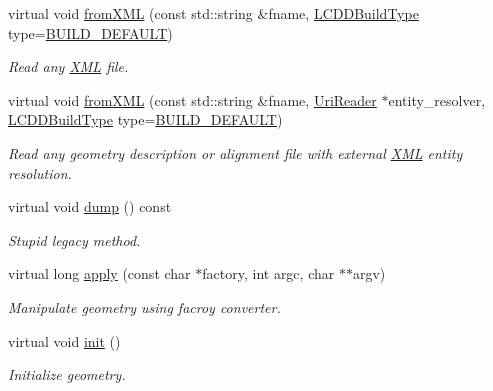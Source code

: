 \begin{DoxyCompactItemize}
virtual void \hyperlink{class_d_d4hep_1_1_geometry_1_1_l_c_d_d_imp_ade843dae125e811b1ce48f7bfa2dc0ef}{from\+X\+ML} (const std\+::string \&fname, \hyperlink{namespace_d_d4hep_acafe43ba4537ab6e999e808142965fab}{L\+C\+D\+D\+Build\+Type} type=\hyperlink{namespace_d_d4hep_acafe43ba4537ab6e999e808142965fabaceac720f961afd2369fcc9f343113a2e}{B\+U\+I\+L\+D\+\_\+\+D\+E\+F\+A\+U\+LT})
\begin{DoxyCompactList}\small\item\em Read any \hyperlink{namespace_d_d4hep_1_1_x_m_l}{X\+ML} file. \end{DoxyCompactList}\item 
virtual void \hyperlink{class_d_d4hep_1_1_geometry_1_1_l_c_d_d_imp_ae1c435032cd33235cd6405ca8d8aae9b}{from\+X\+ML} (const std\+::string \&fname, \hyperlink{class_d_d4hep_1_1_geometry_1_1_l_c_d_d_a69f1e3e4fbcef1d57f1df1c2bd85918f}{Uri\+Reader} $\ast$entity\+\_\+resolver, \hyperlink{namespace_d_d4hep_acafe43ba4537ab6e999e808142965fab}{L\+C\+D\+D\+Build\+Type} type=\hyperlink{namespace_d_d4hep_acafe43ba4537ab6e999e808142965fabaceac720f961afd2369fcc9f343113a2e}{B\+U\+I\+L\+D\+\_\+\+D\+E\+F\+A\+U\+LT})
\begin{DoxyCompactList}\small\item\em Read any geometry description or alignment file with external \hyperlink{namespace_d_d4hep_1_1_x_m_l}{X\+ML} entity resolution. \end{DoxyCompactList}\item 
virtual void \hyperlink{class_d_d4hep_1_1_geometry_1_1_l_c_d_d_imp_a0194b8c2b0af774894f606ed48e205db}{dump} () const
\begin{DoxyCompactList}\small\item\em Stupid legacy method. \end{DoxyCompactList}\item 
virtual long \hyperlink{class_d_d4hep_1_1_geometry_1_1_l_c_d_d_imp_a3dfdf0180fa0a61067bd1f12fa15ecd6}{apply} (const char $\ast$factory, int argc, char $\ast$$\ast$argv)
\begin{DoxyCompactList}\small\item\em Manipulate geometry using facroy converter. \end{DoxyCompactList}\item 
virtual void \hyperlink{class_d_d4hep_1_1_geometry_1_1_l_c_d_d_imp_af0cf7ab83180ee15085bcc7e1383f561}{init} ()
\begin{DoxyCompactList}\small\item\em Initialize geometry. \end{DoxyCompactList}\item 
$$
\end{DoxyCompactItemize}
